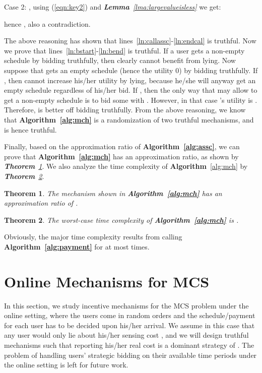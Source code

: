 \documentclass[10pt,journal,compsoc]{IEEEtran}
\newtheorem{theorem}{\textbf{Theorem}}
\begin{document}
\begin{IEEEproof}
    Case 2: , using (\ref{eqn:key2}) and \textit{\textbf{Lemma}~\ref{lma:largevalueisless}} we get:

hence , also a contradiction.

    The above reasoning has shown that lines~\ref{ln:callassc}-\ref{ln:endcal} is truthful. Now we prove that lines~\ref{ln:bstart}-\ref{ln:bend} is truthful. If a user  gets a non-empty schedule by bidding truthfully, then  clearly cannot benefit from lying. Now suppose that  gets an empty schedule (hence the utility 0) by bidding truthfully. If , then  cannot increase his/her utility by lying, because he/she will anyway get an empty schedule regardless of his/her bid. If , then the only way that may allow  to get a non-empty schedule is to bid some  with . However, in that case 's utility is . Therefore,  is better off bidding truthfully. From the above reasoning, we know that \textbf{Algorithm~\ref{alg:mch}} is a randomization of two truthful mechanisms, and is hence truthful.
  \end{IEEEproof}

  Finally, based on the approximation ratio of \textbf{Algorithm~\ref{alg:assc}}, we can prove that \textbf{Algorithm~\ref{alg:mch}} has an  approximation ratio, as shown by \textit{\textbf{Theorem}~\ref{thm:mchar}}. We also analyze the time complexity of \textbf{Algorithm}~\ref{alg:mch} by \textit{\textbf{Theorem}~\ref{thm:timcom}}.
\begin{theorem}
    The mechanism shown in \textbf{Algorithm~\ref{alg:mch}} has an approximation ratio of .
    \label{thm:mchar}
  \end{theorem}
\begin{theorem}
    The worst-case time complexity of \textbf{Algorithm~\ref{alg:mch}} is .
    \label{thm:timcom}
  \end{theorem}
Obviously, the major time complexity results from calling \textbf{Algorithm~\ref{alg:payment}} for at most  times.









\section{Online Mechanisms for MCS} \label{sec:online}
In this section, we study incentive mechanisms for the MCS problem under the online setting, where the users come in random orders and the schedule/payment for each user has to be decided upon his/her arrival.
We assume in this case that any user  would only lie about his/her sensing cost , and we will design truthful mechanisms such that reporting his/her real cost is a dominant strategy of .
The problem of handling users' strategic bidding on their available time periods under the online setting is left for future work.
\end{document}
